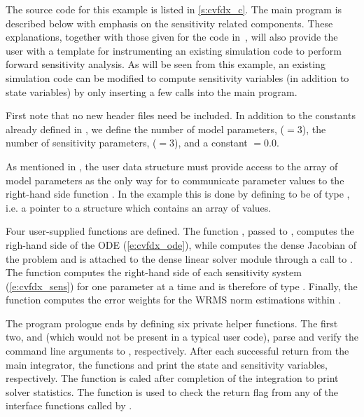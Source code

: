 The source code for this example is listed in \A\ref{s:cvfdx_c}. The main program is described 
below with emphasis on the sensitivity related components. 
These explanations, together with those given for the code 
in~\cite{cvode2.2.0_ex}, will also provide the user with a template for instrumenting 
an existing simulation code to perform forward sensitivity analysis.
As will be seen from this example, an existing simulation code can be modified to compute 
sensitivity variables (in addition to state variables) by only inserting a few {\cvodes} 
calls into the main program. 

First note that no new header files need be included. In addition to the constants already
defined in , we define the number of model parameters,  ($=3$),
the number of sensitivity parameters,  ($=3$), and a constant  $=0.0$. 

As mentioned in , the user data
structure  must provide access to the array of model parameters 
as the only way for {\cvodes} to communicate parameter values to the right-hand side 
function . In the  example this is done by defining  to be 
of type , i.e. a pointer to a structure which contains an array of 
  values.

Four user-supplied functions are defined. The function , passed to
, computes the righ-hand side of the ODE (\ref{e:cvfdx_ode}), while
 computes the dense Jacobian of the problem and is attached to the
dense linear solver module {\cvdense} through a call to .
The function  computes the right-hand side of each sensitivity system
(\ref{e:cvfdx_sens}) for one parameter at a time and is therefore of type
. Finally, the function  computes the error weights for the WRMS norm
estimations within {\cvodes}.

The program prologue ends by defining six private helper functions. 
The first two,  and  (which would not be present in 
a typical user code), parse and verify the command line arguments to , respectively.
After each successful return from the main {\cvodes} integrator, the functions 
 and  print the state and sensitivity variables,
respectively. The function  is caled after completion of the
integration to print solver statistics.
The function  is used to check the return flag from any of the
{\cvodes} interface functions called by .

